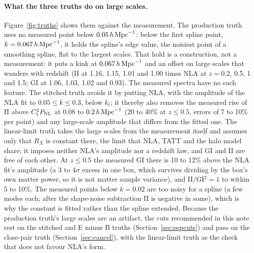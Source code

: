 \documentclass[11pt]{article}
\newcommand{\hMpc}{\,h\,{\rm Mpc}^{-1}}
\newcommand{\PNL}{P_{\rm NL}}
\begin{document}
\paragraph{What the three truths do on large scales.}
Figure~\ref{fig:truths} shows them against the measurement. The production
truth uses no measured point below $0.05\hMpc$: below the first spline point,
$k = 0.067\hMpc$, it holds the spline's edge value, the noisiest point of a
smoothing spline, flat to the largest scales. That hold is a construction,
not a measurement: it puts a kink at $0.067\hMpc$ and an offset on large
scales that wanders with redshift (II at 1.16, 1.15, 1.01 and 1.00 times
NLA at $z = 0.2$, 0.5, 1 and 1.5; GI at 1.06, 1.03, 1.02 and 0.93). The
measured spectra have no such feature. The stitched truth avoids it by
putting NLA, with the amplitude of the NLA fit to $0.05 \le k \le 0.3$, below
$k_t$; it thereby also removes the measured rise of II above $C_1^2\PNL$ at
0.08 to $0.2\hMpc$ (20 to 40\% at $z \le 0.5$, errors of 7 to 10\% per
point) and any large-scale amplitude that differs from the fitted one. The
linear-limit truth takes the large scales from the measurement itself and
assumes only that $R_X$ is constant there, the limit that NLA, TATT and the
halo model share; it imposes neither NLA's amplitude nor a redshift law, and
GI and II are free of each other. At $z \le 0.5$ the measured GI there is
10 to 12\% above the NLA fit's amplitude (a 3 to 4$\sigma$ excess in one box,
which survives dividing by the box's own matter power, so it is not matter
sample variance), and II/GI$^2 = 1$ to within 5 to 10\%. The measured points
below $k = 0.02$ are too noisy for a spline (a few modes each; after the
shape-noise subtraction II is negative in some), which is why the constant
is fitted rather than the spline extended. Because the production truth's
large scales are an artifact, the cuts recommended in this note rest on the
stitched and E minus B truths (Section~\ref{sec:sepcuts}) and pass on the
close-pair truth (Section~\ref{sec:cancel}), with the linear-limit truth as
the check that does not favour NLA's form.
\end{document}
